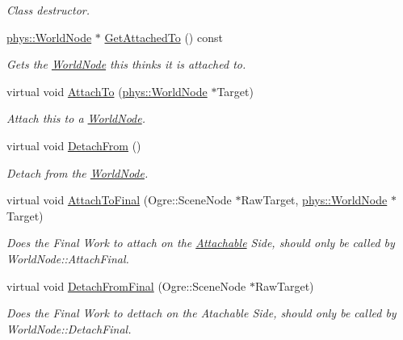 \begin{DoxyCompactItemize}
\begin{DoxyCompactList}\small\item\em Class destructor. \item\end{DoxyCompactList}\item 
\hyperlink{classphys_1_1WorldNode}{phys::WorldNode} $\ast$ \hyperlink{classphys_1_1Attachable_a6df6034ed61c98d350378bdd7a3129f6}{GetAttachedTo} () const 
\begin{DoxyCompactList}\small\item\em Gets the \hyperlink{classphys_1_1WorldNode}{WorldNode} this thinks it is attached to. \item\end{DoxyCompactList}\item 
virtual void \hyperlink{classphys_1_1Attachable_aeec2532772cddde03d3894d99e637367}{AttachTo} (\hyperlink{classphys_1_1WorldNode}{phys::WorldNode} $\ast$Target)
\begin{DoxyCompactList}\small\item\em Attach this to a \hyperlink{classphys_1_1WorldNode}{WorldNode}. \item\end{DoxyCompactList}\item 
virtual void \hyperlink{classphys_1_1Attachable_ab9687346893dd8170726410828d684dd}{DetachFrom} ()
\begin{DoxyCompactList}\small\item\em Detach from the \hyperlink{classphys_1_1WorldNode}{WorldNode}. \item\end{DoxyCompactList}\item 
virtual void \hyperlink{classphys_1_1Attachable_a77c8234874f53b159f4156c0c984fad0}{AttachToFinal} (Ogre::SceneNode $\ast$RawTarget, \hyperlink{classphys_1_1WorldNode}{phys::WorldNode} $\ast$Target)
\begin{DoxyCompactList}\small\item\em Does the Final Work to attach on the \hyperlink{classphys_1_1Attachable}{Attachable} Side, should only be called by WorldNode::AttachFinal. \item\end{DoxyCompactList}\item 
virtual void \hyperlink{classphys_1_1Attachable_a3e4d8113c4b45ece63c29180cf96029a}{DetachFromFinal} (Ogre::SceneNode $\ast$RawTarget)
\begin{DoxyCompactList}\small\item\em Does the Final Work to dettach on the Atachable Side, should only be called by WorldNode::DetachFinal. \item\end{DoxyCompactList}\item 

\end{DoxyCompactItemize}
